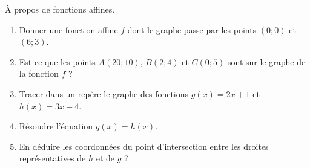 
\begin{exercice}\label{exosmath-0671}

    À propos de fonctions affines.
    \begin{enumerate}
        \item
            Donner une fonction affine \( f\) dont le graphe passe par les points \( (0;0)\) et \( (6;3)\).
        \item
            Est-ce que les points \( A(20;10)\), \( B(2;4)\) et \( C(0;5)\) sont sur le graphe de la fonction \( f\) ?
        \item
            Tracer dans un repère le graphe des fonctions \( g(x)=2x+1\) et \( h(x)=3x-4\).
        \item
            Résoudre l'équation \( g(x)=h(x)\).
        \item
            En déduire les coordonnées du point d'intersection entre les droites représentatives de \( h\) et de \( g\) ?
    \end{enumerate}

\end{exercice}
